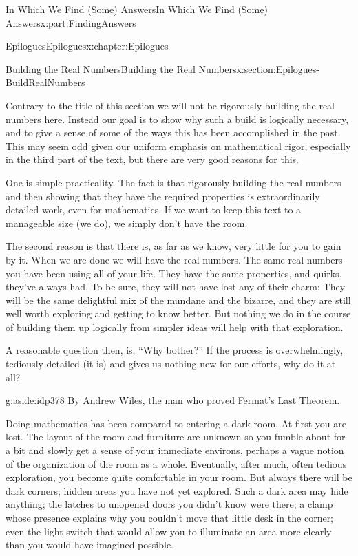 \documentclass[oneside,10pt,]{book}
\numberwithin{equation}{section}
\begin{document}
\begin{partptx}{In Which We Find (Some) Answers}{}{In Which We Find (Some) Answers}{}{}{x:part:FindingAnswers}
\begin{chapterptx}{Epilogues}{}{Epilogues}{}{}{x:chapter:Epilogues}
\begin{sectionptx}{Building the Real Numbers}{}{Building the Real Numbers}{}{}{x:section:Epilogues-BuildRealNumbers}
\begin{introduction}{}%
Contrary to the title of this section we will not be rigorously building the real numbers here. Instead our goal is to show why such a build is logically necessary, and to give a sense of some of the ways this has been accomplished in the past. This may seem odd given our uniform emphasis on mathematical rigor, especially in the third part of the text, but there are very good reasons for this.%
\par
One is simple practicality. The fact is that rigorously building the real numbers and then showing that they have the required properties is extraordinarily detailed work, even for mathematics. If we want to keep this text to a manageable size (we do), we simply don't have the room.%
\par
The second reason is that there is, as far as we know, very little for you to gain by it. When we are done we will have the real numbers. The same real numbers you have been using all of your life. They have the same properties, and quirks, they've always had. To be sure, they will not have lost any of their charm; They will be the same delightful mix of the mundane and the bizarre, and they are still well worth exploring and getting to know better. But nothing we do in the course of building them up logically from simpler ideas will help with that exploration.%
\par
A reasonable question then, is, ``Why bother?'' If the process is overwhelmingly, tediously detailed (it is) and gives us nothing new for our efforts, why do it at all?%
\begin{aside}{}{g:aside:idp378}%
By Andrew Wiles, the man who proved Fermat's Last Theorem.%
\end{aside}
Doing mathematics has been compared to entering a dark room.  At first you are lost.  The layout of the room and furniture are unknown so you fumble about for a bit and slowly get a sense of your immediate environs, perhaps a vague notion of the organization of the room as a whole.  Eventually, after much, often tedious exploration, you become quite comfortable in your room.  But always there will be dark corners; hidden areas you have not yet explored.  Such a dark area may hide anything; the latches to unopened doors you didn't know were there; a clamp whose presence explains why you couldn't move that little desk in the corner; even the light switch that would allow you to illuminate an area more clearly than you would have imagined possible.%
\par

\end{introduction}
\end{sectionptx}
\end{chapterptx}
\end{partptx}
\end{document}
